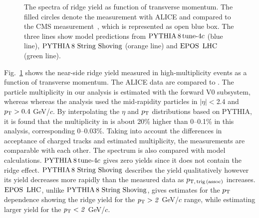 \begin{figure}[h!]
	\centering
	\caption{ The spectra of ridge yield as function of transverse momentum. The filled circles denote the measurement with ALICE and compared to the CMS measurement~\cite{Khachatryan:2015lva}, which is represented as open blue box. The three lines show model predictions from $\mathrm{PYTHIA}\,8\,\mathrm{tune}{\text -}4c$ (blue line), ${\mathrm{PYTHIA}\,8~\mathrm{String}~}\mathrm{Shoving}$ (orange line) and ${\mathrm{EPOS}\,~\mathrm{LHC}}$ (green line).}
	\label{fig:PlotYSpect}
\end{figure}

Fig.~\ref{fig:PlotYSpect} shows the near-side ridge yield measured in high-multiplicity events as a function of transverse momentum. The ALICE data are compared to \cite{Khachatryan:2015lva}.
The particle multiplicity in our analysis is estimated with the forward V0 subsystem, whereas whereas the analysis \cite{Khachatryan:2015lva}  used the mid-rapidity particles in $|\eta|<$2.4 and $p_\mathrm{T}>0.4$ GeV/$c$. By interpolating the $\eta$ and $p_\mathrm{T}{}$ distributions based on PYTHIA, it is found that the multiplicity in \cite{Khachatryan:2015lva} is about 20\% higher than 0--0.1\% in this analysis, corresponding 0--0.03\%. Taking into account the differences in acceptance of charged tracks and estimated multiplicity, the measurements are comparable with each other. The spectrum is also compared with model calculations. $\mathrm{PYTHIA}\,8\,\mathrm{tune}{\text -}4c$ gives zero yields since it does not contain the ridge effect. ${\mathrm{PYTHIA}\,8~\mathrm{String}~}\mathrm{Shoving}$ describes the yield qualitatively however its yield decreases more rapidly than the measured data as $p_\mathrm{T,\,trig\,(assoc)}$ increases. ${\mathrm{EPOS}\,~\mathrm{LHC}}$, unlike ${\mathrm{PYTHIA}\,8~\mathrm{String}~}\mathrm{Shoving}$, gives estimates for the $p_\mathrm{T}$ dependence showing the ridge yield for the $\it{p}_{\rm{T}}>2$ GeV/$c$ range, while estimating larger yield for the $\it{p}_{\rm{T}}<2$ GeV/$c$.

